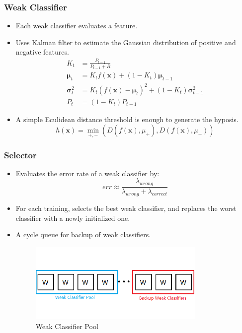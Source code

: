 \documentclass{beamer}
\begin{document}
\begin{frame}
	\frametitle{Weak Classifier}
	\begin{itemize}
		\item Each weak classifier evaluates a feature.
		\item Uses Kalman filter to estimate the Gaussian distribution of positive and negative features.
		\begin{align}
			K_{t}&=\frac{P_{t-1}}{P_{t-1}+R}\\
			\mathbf{\mu}_{t}&=K_{t}f(\mathbf{x})+(1-K_{t})\mathbf{\mu}_{t-1}\\
			\mathbf{\sigma}_{t}^{2}&=K_{t}(f(\mathbf{x})-\mathbf{\mu}_{t})^{2}+(1-K_{t})\mathbf{\sigma}_{t-1}^{2}\\
			P_{t}&=(1-K_{t})P_{t-1}
		\end{align}
		\item A simple Eculidean distance threshold is enough to generate the hyposis.
		\begin{equation}
			h(\mathbf{x})=\min_{+, -}(D(f(\mathbf{x}), \mu_{+}), D(f(\mathbf{x}), \mu_{-}))
		\end{equation}
	\end{itemize}
\end{frame}

\begin{frame}
	\frametitle{Selector}
	\begin{itemize}
		\item Evaluates the error rate of a weak classifier by:
		\begin{equation}
			err\approx\frac{\lambda_{wrong}}{\lambda_{wrong}+\lambda_{correct}}
		\end{equation}
		\item For each training, selects the best weak classifier, and replaces the worst classifier with a newly initialized one.
		\item A cycle queue for backup of weak classifiers.
		\begin{figure}
			\begin{center}
			\includegraphics[width=0.8\textwidth]{images/WeakClassifierPool.png}
			\caption{Weak Classifier Pool}
			\end{center}
		\end{figure}
	\end{itemize}
\end{frame}
\end{document}

